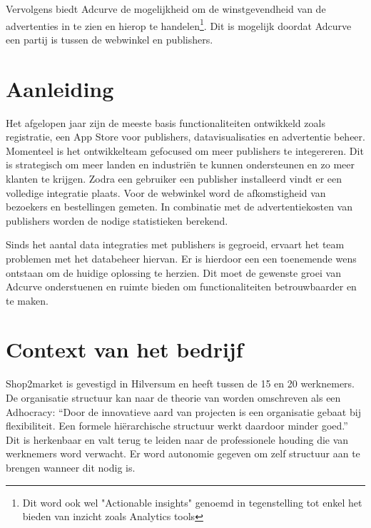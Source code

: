 Vervolgens biedt Adcurve de mogelijkheid om de winstgevendheid van de advertenties in te zien en hierop te handelen\footnote{Dit word ook wel "Actionable insights" genoemd in tegenstelling tot enkel het bieden van inzicht zoals Analytics tools}. Dit is mogelijk doordat Adcurve een partij is tussen de webwinkel en publishers.

\section{Aanleiding} %

Het afgelopen jaar zijn de meeste basis functionaliteiten ontwikkeld zoals registratie, een App Store voor publishers, datavisualisaties en advertentie beheer. Momenteel is het ontwikkelteam gefocused om meer publishers te integereren. Dit is strategisch om meer landen en industriën te kunnen ondersteunen en zo meer klanten te krijgen. Zodra een gebruiker een publisher installeerd vindt er een volledige integratie plaats. Voor de webwinkel word de afkomstigheid van bezoekers en bestellingen gemeten. In combinatie met de advertentiekosten van publishers worden de nodige statistieken berekend.

Sinds het aantal data integraties met publishers is gegroeid, ervaart het team problemen met het databeheer hiervan. Er is hierdoor een een toenemende wens ontstaan om de huidige oplossing te herzien. Dit moet de gewenste groei van Adcurve onderstuenen en ruimte bieden om functionaliteiten betrouwbaarder en te maken.

\section{Context van het bedrijf} %

Shop2market is gevestigd in Hilversum en heeft tussen de 15 en 20 werknemers. De organisatie structuur kan naar de theorie van \autocite{mintzberg} worden omschreven als een Adhocracy: “Door de innovatieve aard van projecten is een organisatie gebaat bij flexibiliteit. Een formele hiërarchische structuur werkt daardoor minder goed.” Dit is herkenbaar en valt terug te leiden naar de professionele houding die van werknemers word verwacht. Er word autonomie gegeven om zelf structuur aan te brengen wanneer dit nodig is.

